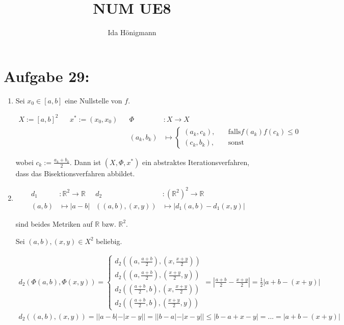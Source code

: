 \documentclass[]{article}
\title{NUM UE8}
\author{Ida Hönigmann}
\begin{document}
\maketitle

\section{Aufgabe 29:}

\begin{enumerate}[label=\alph*)]
	\item 
	
	Sei $x_0 \in [a,b]$ eine Nullstelle von $f$.
	
	\begin{align*}
		X := [a,b]^2 && x^* := (x_0, x_0) && \Phi &: X \rightarrow X \\
		&& && (a_k, b_k) &\mapsto \begin{cases}
			(a_k, c_k), &\quad\text{falls} f(a_k)f(c_k)\le 0 \\
			(c_k, b_k), &\quad\text{sonst}
		\end{cases}
	\end{align*}

	wobei $c_k:=\frac{a_k+b_k}{2}$. Dann ist $(X, \Phi, x^*)$ ein abstraktes Iterationsverfahren, dass das Bisektionsverfahren abbildet.
	
	\item
	
	\begin{align*}
		d_1&:\mathbb{R}^2\rightarrow\mathbb{R} & d_2 &:(\mathbb{R}^2)^2\rightarrow\mathbb{R} \\
		(a,b)&\mapsto |a-b| & ((a,b),(x,y))&\mapsto|d_1(a,b) - d_1(x,y)| 
	\end{align*}

	sind beides Metriken auf $\mathbb{R}$ bzw. $\mathbb{R}^2$.
	
	Sei $(a,b), (x,y) \in X^2$ beliebig.
	
	\begin{align*}
		d_2(\Phi(a,b), \Phi(x,y))=
		\begin{cases}
			d_2((a, \frac{a+b}{2}), (x,\frac{x+y}{2})) \\
			d_2((a, \frac{a+b}{2}), (\frac{x+y}{2},y)) \\
			d_2((\frac{a+b}{2}, b), (x,\frac{x+y}{2})) \\
			d_2((\frac{a+b}{2}, b), (\frac{x+y}{2},y)) 
		\end{cases}
		= \left|\frac{a+b}{2}-\frac{x+y}{2}\right| = \frac{1}{2} |a+b-(x+y)| \\
		d_2((a,b),(x,y))=||a-b|-|x-y||=||b-a|-|x-y||\le|b-a+x-y|=...=|a+b-(x+y)|
	\end{align*}
	

\end{enumerate}
\end{document}

